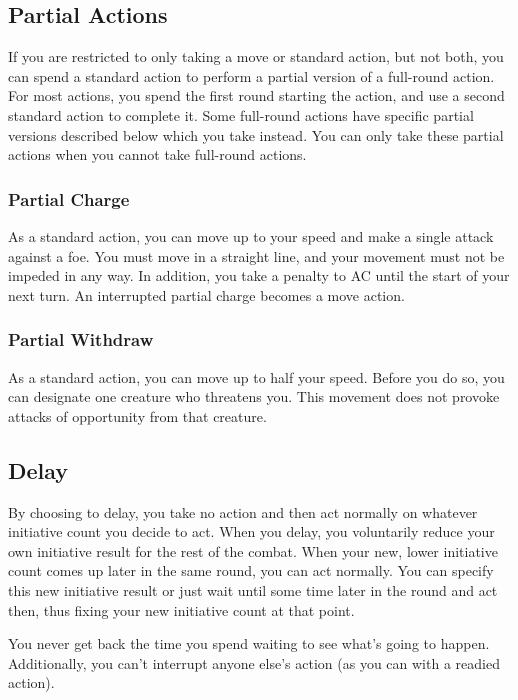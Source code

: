 \subsection{Partial Actions}

If you are restricted to only taking a move or standard action, but not both, you can spend a standard action to perform a partial version of a full-round action. For most actions, you spend the first round starting the action, and use a second standard action to complete it. Some full-round actions have specific partial versions described below which you take instead. You can only take these partial actions when you cannot take full-round actions. 

\subsubsection{Partial Charge}
As a standard action, you can move up to your speed and make a single attack against a foe. You must move in a straight line, and your movement must not be impeded in any way. In addition, you take a  penalty to AC until the start of your next turn. An interrupted partial charge becomes a move action.

\subsubsection{Partial Withdraw}
As a standard action, you can move up to half your speed. Before you do so, you can designate one creature who threatens you. This movement does not provoke attacks of opportunity from that creature.

\subsection{Delay}\label{Delay}
By choosing to delay, you take no action and then act normally on whatever initiative count you decide to act. When you delay, you voluntarily reduce your own initiative result for the rest of the combat. When your new, lower initiative count comes up later in the same round, you can act normally. You can specify this new initiative result or just wait until some time later in the round and act then, thus fixing your new initiative count at that point.

You never get back the time you spend waiting to see what's going to happen. Additionally, you can't interrupt anyone else's action (as you can with a readied action).

